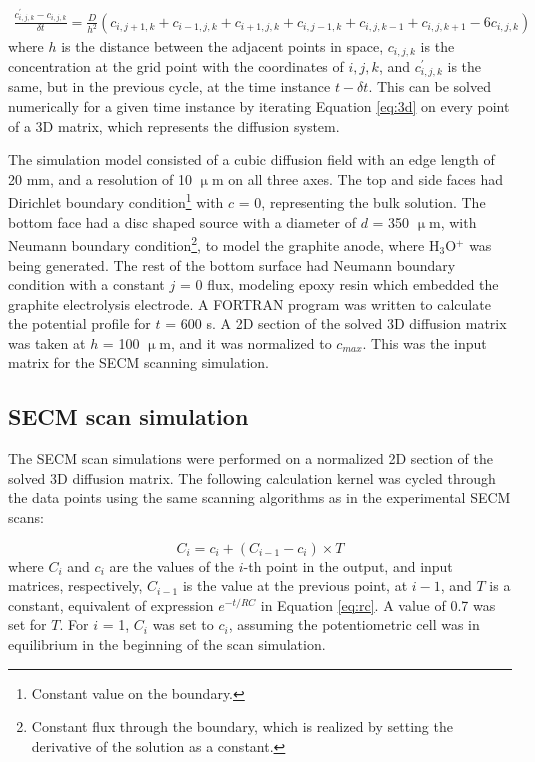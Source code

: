 \begin{equation}
\label{eq:3d}
	\begin{split}
	\frac   {c_{i,j,k}^{'} - c_{i,j,k}}{\delta t}
	=
	\frac {D} {h^2} (c_{i,j+1,k} + c_{i-1,j,k} + c_{i+1,j,k} + c_{i,j-1,k} + c_{i,j,k-1} + c_{i,j,k+1} - 6c_{i,j,k})
	\end{split}
\end{equation}
where $h$ is the distance between the adjacent points in space, $c_{i,j,k}$ is the concentration at the grid point with the coordinates of $i, j, k$, and $c_{i,j,k}^{'}$ is the same, but in the previous cycle, at the time instance $t-\delta t$.
This can be solved numerically for a given time instance by iterating Equation \ref{eq:3d} on every point of a 3D matrix, which represents the diffusion system.

The simulation model consisted of a cubic diffusion field with an edge length of 20 mm, and a resolution of 10 $\upmu$m on all three axes.
The top and side faces had Dirichlet boundary condition\footnote{Constant value on the boundary.} with $c$ = 0, representing the bulk solution.
The bottom face had a disc shaped source with a diameter of $d$ = 350 $\upmu$m, with Neumann boundary condition\footnote{Constant flux through the boundary, which is realized by setting the derivative of the solution as a constant.}, to model the graphite anode, where H$_3$O$^{+}$ was being generated.
The rest of the bottom surface had Neumann boundary condition with a constant $j$ = 0 flux, modeling epoxy resin which embedded the graphite electrolysis electrode.
A FORTRAN program was written to calculate the potential profile for $t$ = 600 s.
A 2D section of the solved 3D diffusion matrix was taken at $h$ = 100 $\upmu$m, and it was normalized to $c_{max}$.
This was the input matrix for the SECM scanning simulation.

		\subsection{SECM scan simulation}
The SECM scan simulations were performed on a normalized 2D section of the solved 3D diffusion matrix.
The following calculation kernel was cycled through the data points using the same scanning algorithms as in the experimental SECM scans:

\begin{equation}
\label{eq:scan}
C_i = c_i + ( C_{i-1} - c_i ) \times T
\end{equation}
where $C_i$ and $c_i$ are the values of the $i$-th point in the output, and input matrices, respectively, $C_{i-1}$ is the value at the previous point, at $i-1$, and $T$ is a constant, equivalent of expression $e^{-t/RC}$ in Equation \ref{eq:rc}.
A value of 0.7 was set for $T$.
For $i$ = 1, $C_i$ was set to $c_i$, assuming the potentiometric cell was in equilibrium in the beginning of the scan simulation.

